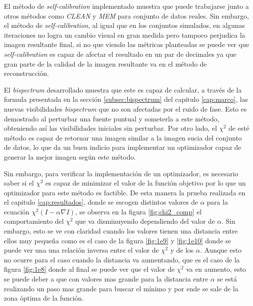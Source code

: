 El método de \textit{self-calibration} implementado muestra que puede trabajarse junto a otros métodos como \textit{CLEAN} y \textit{MEM} para conjunto de datos reales. Sin embargo, el método de \textit{self-calibration}, al igual que en los conjuntos simulados, en algunas iteraciones no logra un cambio visual en gran medida pero tampoco perjudica la imagen resultante final, si no que viendo las métricas planteadas se puede ver que \textit{self-calibration} es capaz de afectar el resultado en un par de decimales ya que gran parte de la calidad de la imagen resultante va en el método de reconstrucción. 

El \textit{bispectrum} desarrollado muestra que este es capaz de calcular, a través de la formula presentada en la sección \ref{subsec:bispectrum} del capitulo \ref{cap:marco}, las nuevas visibilidades \textit{bispectrum} que no son afectadas por el ruido de fase. Esto es demostrado al perturbar una fuente puntual y someterla a este método, obteniendo así las visibilidades iniciales sin perturbar. Por otro lado, el $\chi^{2}$ de esté método es capaz de retornar una imagen similar a la imagen sucia del conjunto de datos, lo que da un buen indicio para implementar un optimizador capaz de generar la mejor imagen según este método. 

Sin embargo, para verificar la implementación de un optimizador, es necesario saber si el $\chi^{2}$ es capaz de minimizar el valor de la función objetivo por lo que un optimizador para este método es factible. De esta manera la prueba realizada en el capitulo \ref{cap:resultados}, donde se escogen distintos valores de $\alpha$ para la ecuación $\chi^{2}(I - \alpha \nabla I)$, se observa en la figura \ref{fig:chi2_comp} el comportamiento del $\chi^{2}$ que va disminuyendo dependiendo del valor de $\alpha$. Sin embargo, esto se ve con claridad cuando los valores tienen una distancia entre ellos muy pequeña como es el caso de la figura \ref{fig:1e9} y \ref{fig:1e10} donde se puede ver una una relación inversa entre el valor de $\chi^{2}$ y de los $\alpha$. Aunque esto no ocurre para el caso cuando la distancia va aumentando, que es el caso de la figura \ref{fig:1e8} donde al final se puede ver que el valor de $\chi^{2}$ va en aumento, esto se puede deber a que con valores mas grande para la distancia entre $\alpha$ se está realizando un paso mas grande para buscar el mínimo y por ende se sale de la zona óptima de la función. 

